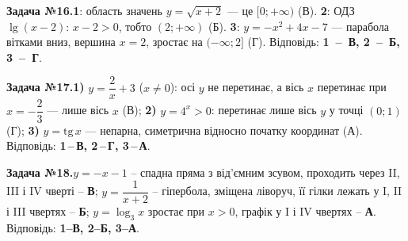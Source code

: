 \documentclass[12pt]{article}
\begin{document}
\par\vspace{0.3cm}\noindent\hypertarget{sol:16}{}
\begin{tcolorbox}[colback=titleBg!40, colframe=mainGreen!55, boxrule=0.4pt, arc=2pt, left=6pt, right=6pt, top=4pt, bottom=4pt, breakable]
\noindent\small\textbf{Задача №16.}\quad \textbf{1}: область значень $y=\sqrt{x+2}$ — це $[0;+\infty)$ (В). \textbf{2}: ОДЗ $\lg(x-2)$: $x-2>0$, тобто $(2;+\infty)$ (Б). \textbf{3}: $y=-x^2+4x-7$ — парабола вітками вниз, вершина $x=2$, зростає на $(-\infty;2]$ (Г). Відповідь: \textbf{1~--~В, 2~--~Б, 3~--~Г}.
\par\vspace{0.1cm}\hfill\hyperlink{task:16}{}
\end{tcolorbox}
\par\vspace{0.3cm}\noindent\hypertarget{sol:17}{}
\begin{tcolorbox}[colback=titleBg!40, colframe=mainGreen!55, boxrule=0.4pt, arc=2pt, left=6pt, right=6pt, top=4pt, bottom=4pt, breakable]
\noindent\small\textbf{Задача №17.}\quad \textbf{1)} $y=\dfrac{2}{x}+3$ ($x\ne0$): осі $y$ не перетинає, а вісь $x$ перетинає при $x=-\dfrac{2}{3}$ --- лише вісь $x$ (В); \textbf{2)} $y=4^x>0$: перетинає лише вісь $y$ у точці $(0;1)$ (Г); \textbf{3)} $y=\mathrm{tg}\,x$ --- непарна, симетрична відносно початку координат (А). Відповідь: \textbf{1\,--\,В, 2\,--\,Г, 3\,--\,А}.
\par\vspace{0.1cm}\hfill\hyperlink{task:17}{}
\end{tcolorbox}
\par\vspace{0.3cm}\noindent\hypertarget{sol:18}{}
\begin{tcolorbox}[colback=titleBg!40, colframe=mainGreen!55, boxrule=0.4pt, arc=2pt, left=6pt, right=6pt, top=4pt, bottom=4pt, breakable]
\noindent\small\textbf{Задача №18.}\quad $y=-x-1$ -- спадна пряма з від'ємним зсувом, проходить через II, III і IV чверті -- \textbf{В}; $y=\dfrac{1}{x+2}$ -- гіпербола, зміщена ліворуч, її гілки лежать у I, II і III чвертях -- \textbf{Б}; $y=\log_3 x$ зростає при $x>0$, графік у I і IV чвертях -- \textbf{А}. Відповідь: \textbf{1--В, 2--Б, 3--А}.
\par\vspace{0.1cm}\hfill\hyperlink{task:18}{}
\end{tcolorbox}
\end{document}
